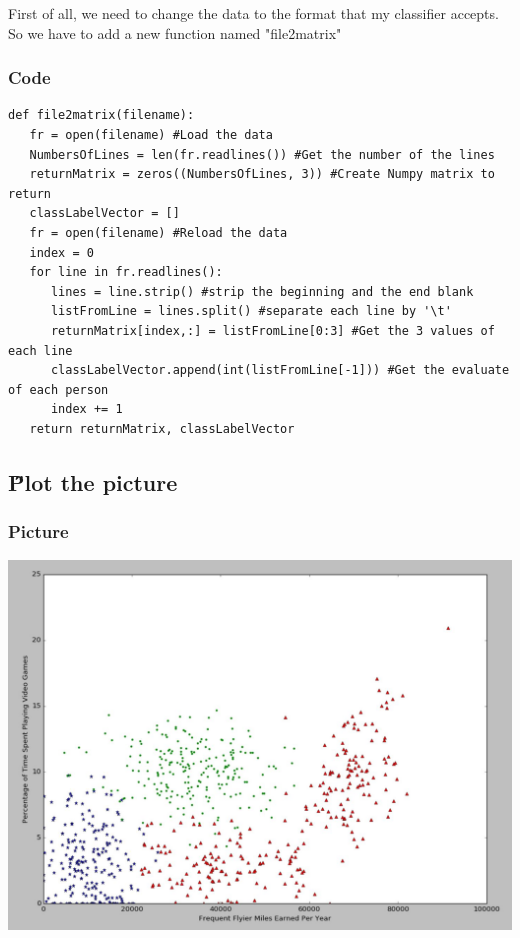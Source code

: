 \documentclass[12pt]{article}
\begin{document}
First of all, we need to change the data to the format that my classifier accepts. So we have to add a new function named "file2matrix"
\subsubsection{Code}
\begin{lstlisting}
def file2matrix(filename):
   fr = open(filename) #Load the data
   NumbersOfLines = len(fr.readlines()) #Get the number of the lines
   returnMatrix = zeros((NumbersOfLines, 3)) #Create Numpy matrix to return
   classLabelVector = []
   fr = open(filename) #Reload the data
   index = 0
   for line in fr.readlines():
      lines = line.strip() #strip the beginning and the end blank
      listFromLine = lines.split() #separate each line by '\t'
      returnMatrix[index,:] = listFromLine[0:3] #Get the 3 values of each line
      classLabelVector.append(int(listFromLine[-1])) #Get the evaluate of each person
      index += 1
   return returnMatrix, classLabelVector
\end{lstlisting}

\subsection{\H Plot the picture}
\subsubsection{Picture}
\includegraphics[width=5.5in]{1.jpg}
\end{document}
